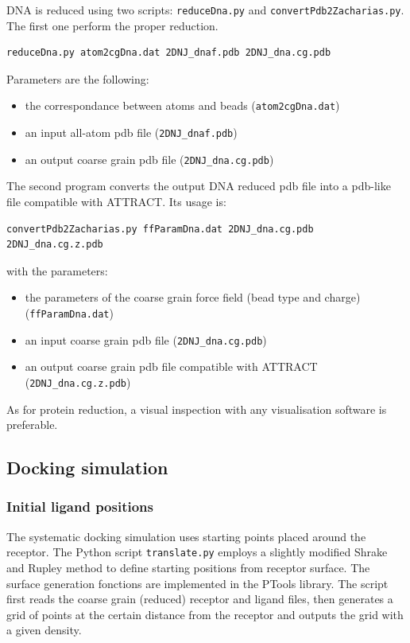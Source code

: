 \documentclass[12pt,a4paper]{article}
\begin{document}
DNA is reduced using two scripts: {\tt reduceDna.py} and {\tt convertPdb2Zacharias.py}. The first one perform the proper reduction.
\begin{verbatim}
reduceDna.py atom2cgDna.dat 2DNJ_dnaf.pdb 2DNJ_dna.cg.pdb
\end{verbatim}
Parameters are the following:
\begin{itemize}
\item the correspondance between atoms and beads ({\tt atom2cgDna.dat})
\item an input all-atom pdb file ({\tt 2DNJ\_dnaf.pdb})
\item an output coarse grain pdb file ({\tt 2DNJ\_dna.cg.pdb})
\end{itemize}

The second program converts the output DNA reduced pdb file into a pdb-like file compatible with ATTRACT. Its usage is:
\begin{verbatim}
convertPdb2Zacharias.py ffParamDna.dat 2DNJ_dna.cg.pdb 2DNJ_dna.cg.z.pdb
\end{verbatim}
with the parameters:
\begin{itemize}
\item the parameters of the coarse grain force field (bead type and charge) ({\tt ffParamDna.dat})
\item an input coarse grain pdb file ({\tt 2DNJ\_dna.cg.pdb})
\item an output coarse grain pdb file compatible with ATTRACT ({\tt 2DNJ\_dna.cg.z.pdb})
\end{itemize}

As for protein reduction, a visual inspection with any visualisation software is preferable.

\subsection{Docking simulation}

\subsubsection{Initial ligand positions}


The systematic docking simulation uses starting points placed around the
receptor.  The Python script {\tt translate.py} employs a slightly modified
Shrake and Rupley \cite{shrake1973} method to define starting positions
from receptor surface.  The surface generation fonctions are implemented in
the PTools library. The script first reads the coarse grain (reduced)
receptor and ligand files, then generates a grid of points at the certain
distance from the receptor and outputs the grid with a given density.
\end{document}
